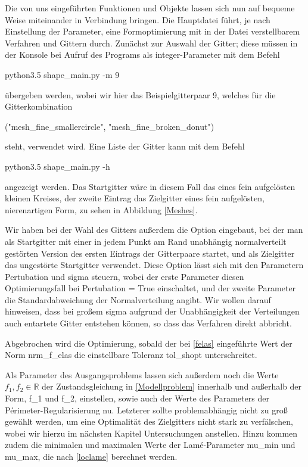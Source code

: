 Die von uns eingeführten Funktionen und Objekte lassen sich nun auf bequeme Weise miteinander in Verbindung bringen. Die Hauptdatei führt, je nach Einstellung der Parameter, eine Formoptimierung mit in der Datei verstellbarem Verfahren und Gittern durch. Zunächst zur Auswahl der Gitter; diese müssen in der Konsole bei Aufruf des Programs als \textsf{integer}-Parameter mit dem Befehl
\begin{center}
 \textsf{python3.5 shape\_main.py -m 9}
\end{center}
übergeben werden, wobei wir hier das Beispielgitterpaar 9, welches für die Gitterkombination
\begin{center}
\textsf{("mesh\_fine\_smallercircle", "mesh\_fine\_broken\_donut")}
\end{center}
steht, verwendet wird. Eine Liste der Gitter kann mit dem Befehl 
\begin{center}
 \textsf{python3.5 shape\_main.py -h}
\end{center}
angezeigt werden. Das Startgitter wäre in diesem Fall das eines fein aufgelösten kleinen Kreises, der zweite Eintrag das Zielgitter eines fein aufgelösten, nierenartigen Form, zu sehen in Abbildung \ref{Meshes}.

Wir haben bei der Wahl des Gitters außerdem die Option eingebaut, bei der man als Startgitter mit einer in jedem Punkt am Rand unabhängig normalverteilt gestörten Version des ersten Eintrags der Gitterpaare startet, und als Zielgitter das ungestörte Startgitter verwendet. Diese Option lässt sich mit den Parametern \textsf{Pertubation} und \textsf{sigma} steuern, wobei der erste Parameter diesen Optimierungsfall bei \textsf{Pertubation = True} einschaltet, und der zweite Parameter die Standardabweichung der Normalverteilung angibt. Wir wollen darauf hinweisen, dass bei großem \textsf{sigma} aufgrund der Unabhängigkeit der Verteilungen auch entartete Gitter entstehen können, so dass das Verfahren direkt abbricht.

Abgebrochen wird die Optimierung, sobald der bei \ref{felas} eingeführte Wert der Norm \textsf{nrm\_f\_elas} die einstellbare Toleranz \textsf{tol\_shopt} unterschreitet.

Als Parameter des Ausgangsproblems lassen sich außerdem noch die Werte $f_1, f_2 \in \mathbb{R}$ der Zustandsgleichung in \ref{Modellproblem} innerhalb und außerhalb der Form, \textsf{f\_1} und \textsf{f\_2}, einstellen, sowie auch der Werte des Parameters der Périmeter-Regularisierung \textsf{nu}. Letzterer sollte problemabhängig nicht zu groß gewählt werden, um eine Optimalität des Zielgitters nicht stark zu verfälschen, wobei wir hierzu im nächsten Kapitel Untersuchungen anstellen. Hinzu kommen zudem die minimalen und maximalen Werte der Lamé-Parameter \textsf{mu\_min} und \textsf{mu\_max}, die nach \ref{loclame} berechnet werden.

